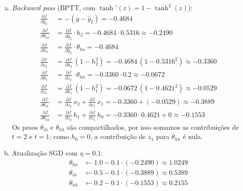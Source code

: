 \documentclass{dlproblemset}
\begin{document}
\begin{enumerate}[I)]
\begin{enumerate}[a)]
        \item \textit{Backward pass} (BPTT, com $\tanh'(z) = 1 - \tanh^2(z)$):
        \begin{align*}
            \frac{\partial J}{\partial \hat{y}_2} &= -(y - \hat{y}_2) = -0.4684 \\
            \frac{\partial J}{\partial \theta_{ho}} &= \frac{\partial J}{\partial \hat{y}_2}\cdot h_2 = -0.4684\cdot 0.5316 \approx -0.2490 \\
            \frac{\partial J}{\partial h_2} &= \frac{\partial J}{\partial \hat{y}_2}\cdot \theta_{ho} = -0.4684 \\
            \frac{\partial J}{\partial z_2} &= \frac{\partial J}{\partial h_2}\,(1 - h_2^2) = -0.4684\,(1 - 0.5316^2) \approx -0.3360 \\
            \frac{\partial J}{\partial h_1} &= \frac{\partial J}{\partial z_2}\cdot \theta_{hh} = -0.3360\cdot 0.2 \approx -0.0672 \\
            \frac{\partial J}{\partial z_1} &= \frac{\partial J}{\partial h_1}\,(1 - h_1^2) = -0.0672\,(1 - 0.4621^2) \approx -0.0529 \\[0.3em]
            \frac{\partial J}{\partial \theta_{ih}} &= \frac{\partial J}{\partial z_2}\,x_2 + \frac{\partial J}{\partial z_1}\,x_1 = -0.3360 + (-0.0529) \approx -0.3889 \\
            \frac{\partial J}{\partial \theta_{hh}} &= \frac{\partial J}{\partial z_2}\,h_1 + \frac{\partial J}{\partial z_1}\,h_0 = -0.3360\cdot 0.4621 + 0 \approx -0.1553
        \end{align*}
        Os pesos $\theta_{ih}$ e $\theta_{hh}$ são compartilhados, por isso somamos as contribuições de $t = 2$ e $t = 1$; como $h_0 = 0$, a contribuição de $z_1$ para $\theta_{hh}$ é nula.

        \item Atualização SGD com $\eta = 0.1$:
        \begin{align*}
            \theta_{ho} &\leftarrow 1.0 - 0.1\cdot(-0.2490) \approx 1.0249 \\
            \theta_{ih} &\leftarrow 0.5 - 0.1\cdot(-0.3889) \approx 0.5389 \\
            \theta_{hh} &\leftarrow 0.2 - 0.1\cdot(-0.1553) \approx 0.2155
        \end{align*}
    \end{enumerate}

\end{enumerate}
\end{document}
